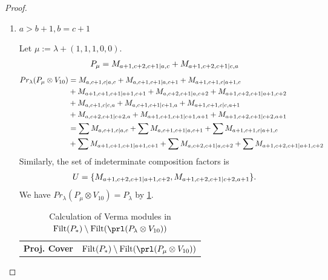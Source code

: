 \begin{proof}
\begin{enumerate}
\begin{enumerate}
        \item $a>b+1,b=c+1$ \par
        Let $\mu:=\lambda + (1,1,1,0,0) $.
        \begin{equation}\notag
          \begin{aligned}
            P_\mu = M_{a+1,c+2,c+1|a,c}
+ M_{a+1,c+2,c+1|c,a}
          \end{aligned}
        \end{equation}
        \begin{equation}\notag
          \begin{aligned}
            Pr_{\lambda}(P_\mu \otimes V_{10}) &=
M_{a,c+1,c|a,c}
+ M_{a,c+1,c+1|a,c+1}
+ M_{a+1,c+1,c|a+1,c}\\
                                              &
+ M_{a+1,c+1,c+1|a+1,c+1}
+ M_{a,c+2,c+1|a,c+2}
+ M_{a+1,c+2,c+1|a+1,c+2}\\
                                              &
+ M_{a,c+1,c|c,a}
+ M_{a,c+1,c+1|c+1,a}
+ M_{a+1,c+1,c|c,a+1}\\
                                              &
+ M_{a,c+2,c+1|c+2,a}
+ M_{a+1,c+1,c+1|c+1,a+1}
+ M_{a+1,c+2,c+1|c+2,a+1} \\
                                               &=
\sum M_{a,c+1,c|a,c}
+ \sum M_{a,c+1,c+1|a,c+1}
+ \sum M_{a+1,c+1,c|a+1,c}\\
                                              &
+ \sum M_{a+1,c+1,c+1|a+1,c+1}
+ \sum M_{a,c+2,c+1|a,c+2}
+ \sum M_{a+1,c+2,c+1|a+1,c+2}
          \end{aligned}
        \end{equation}
      Similarly, the set of indeterminate composition factors is 
\begin{equation}\notag
  \begin{aligned}
    U = \{
M_{a+1,c+2,c+1|a+1,c+2},
M_{a+1,c+2,c+1|c+2,a+1}
\}.
  \end{aligned}
\end{equation}
       We have $Pr_{\lambda}(P_\mu \otimes V_{10}) = P_\lambda  $ by \cref{tab:verma-analysis_e_1}.
\begin{table}[htbp]
\centering
\caption{Calculation of Verma modules in $\operatorname{Filt}(P_*) \setminus \operatorname{Filt}(\prl(P_\lambda \otimes V_{10})) $ } \label{tab:verma-analysis_e_1}
\begin{tabular}{cc}
\toprule
\textbf{Proj. Cover} & \textbf{$\operatorname{Filt}(P_*) \setminus \operatorname{Filt}(\prl(P_\mu \otimes V_{10})) $}  \\

\end{tabular}
\end{table}
\end{enumerate}
\end{enumerate}
\end{proof}

